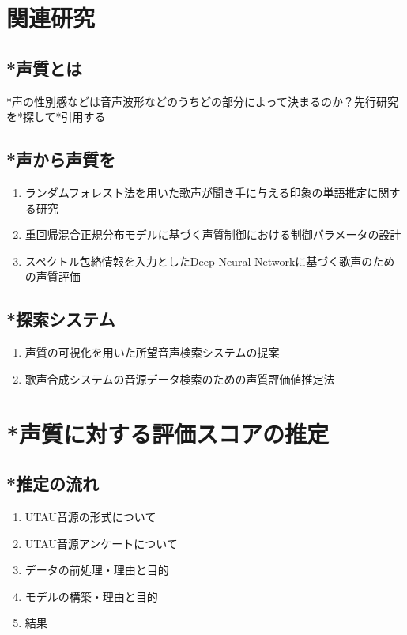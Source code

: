 \documentclass[a4j,8pt,twocolumn]{extarticle}
\begin{document}
\section{関連研究}
\subsection{*声質とは}
*声の性別感などは音声波形などのうちどの部分によって決まるのか？先行研究を*探して*引用する

\subsection{*声から声質を}
\begin{enumerate}
  \item ランダムフォレスト法を用いた歌声が聞き手に与える印象の単語推定に関する研究
  \item 重回帰混合正規分布モデルに基づく声質制御における制御パラメータの設計
  \item スペクトル包絡情報を入力としたDeep Neural Networkに基づく歌声のための声質評価
\end{enumerate}

\subsection{*探索システム}
\begin{enumerate}
  \item 声質の可視化を用いた所望音声検索システムの提案
  \item 歌声合成システムの音源データ検索のための声質評価値推定法
\end{enumerate}

\section{*声質に対する評価スコアの推定}
\subsection{*推定の流れ}
\begin{enumerate}
  \item UTAU音源の形式について
  \item UTAU音源アンケートについて
  \item データの前処理・理由と目的
  \item モデルの構築・理由と目的
  \item 結果
\end{enumerate}
\end{document}

